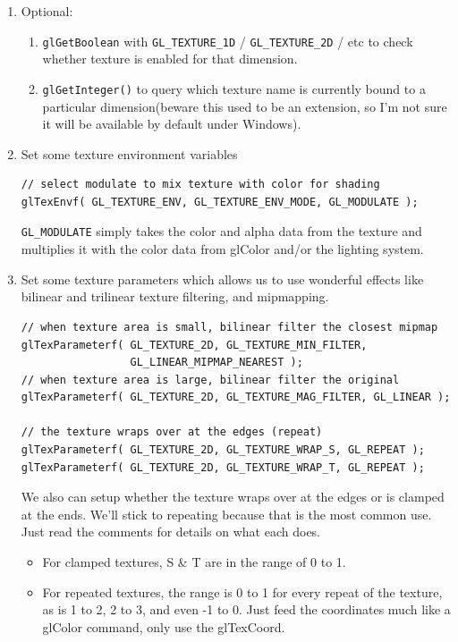 \begin{enumerate}
\item Optional:
  \begin{enumerate}
  \item \verb!glGetBoolean! with \verb!GL_TEXTURE_1D! /
    \verb!GL_TEXTURE_2D! / etc to check whether texture is enabled for
    that dimension. 
  \item \verb!glGetInteger()! to query which texture name is currently
    bound to a particular dimension(beware this used to be an
    extension, so I'm not sure it will be available by default under
    Windows).
  \end{enumerate}

\item Set some texture environment variables
\begin{verbatim}
// select modulate to mix texture with color for shading
glTexEnvf( GL_TEXTURE_ENV, GL_TEXTURE_ENV_MODE, GL_MODULATE );
\end{verbatim}
  \verb!GL_MODULATE! simply takes the color and alpha data from the
  texture and multiplies it with the color data from glColor and/or
  the lighting system.


\item Set some texture parameters which allows us to use wonderful
  effects like bilinear and trilinear texture filtering, and
  mipmapping. 
\begin{verbatim}
// when texture area is small, bilinear filter the closest mipmap
glTexParameterf( GL_TEXTURE_2D, GL_TEXTURE_MIN_FILTER,
                 GL_LINEAR_MIPMAP_NEAREST );
// when texture area is large, bilinear filter the original
glTexParameterf( GL_TEXTURE_2D, GL_TEXTURE_MAG_FILTER, GL_LINEAR );

// the texture wraps over at the edges (repeat)
glTexParameterf( GL_TEXTURE_2D, GL_TEXTURE_WRAP_S, GL_REPEAT );
glTexParameterf( GL_TEXTURE_2D, GL_TEXTURE_WRAP_T, GL_REPEAT );
\end{verbatim}
  We also can setup whether the texture wraps over at the edges or is
  clamped at the ends. We'll stick to repeating because that is the
  most common use. Just read the comments for details on what each
  does.
  \begin{itemize}
  \item For clamped textures, S \& T are in the range of 0 to 1.
  \item For repeated textures, the range is 0 to 1 for every repeat of
    the texture, as is 1 to 2, 2 to 3, and even -1 to 0. Just feed the
    coordinates much like a glColor command, only use the glTexCoord.


\end{itemize}
\end{enumerate}
